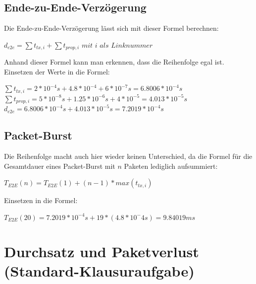 \documentclass{kdiartcl}
\begin{document}
\subsection{Ende-zu-Ende-Verzögerung}
    Die Ende-zu-Ende-Verzögerung lässt sich mit dieser Formel berechnen: \\
    \begin{center}
        $d_{e2e} = \sum t_{tx,i} + \sum t_{prop,i}$ $ mit$ $i$ $als$ $Linknummer$ \\
    \end{center}
    Anhand dieser Formel kann man erkennen, dass die Reihenfolge egal ist. \\
    Einsetzen der Werte in die Formel: \\
    \begin{center}
        $\sum t_{tx,i} = 2 * 10^{-4}s + 4.8 * 10^{-4} + 6 * 10^{-7}s = 6.8006 * 10^{-4}s$ \\
        $\sum t_{prop,i} = 5 * 10^{-8}s + 1.25 * 10^{-6}s + 4 * 10 ^ {-5} = 4.013 * 10^{-5}s$ \\
        $d_{e2e} = 6.8006 * 10^{-4}s + 4.013 * 10^{-5}s = 7.2019 * 10^{-4}s$
    \end{center}

\subsection{Packet-Burst}
    Die Reihenfolge macht auch hier wieder keinen Unterschied, da die Formel für die Gesamtdauer eines Packet-Burst mit $n$ Paketen lediglich aufsummiert: \\
    \begin{center}
        $T_{E2E}(n) = T_{E2E}(1) + (n-1) * max(t_{tx,i})$
    \end{center}
    Einsetzen in die Formel: \\
    \begin{center}
        $T_{E2E}(20) = 7.2019 * 10^{-4}s + 19 * (4.8 * 10^-{4}s) = 9.84019ms$
    \end{center}

\section{Durchsatz und Paketverlust (Standard-Klausuraufgabe)}
\end{document}
